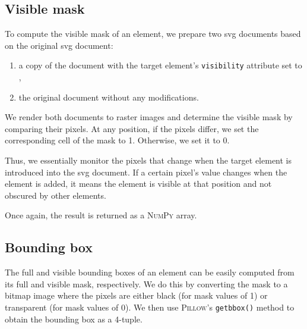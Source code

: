 \subsection{Visible mask}

To compute the visible mask of an element, we prepare two \gls{svg} documents based on the original \gls{svg} document:
\begin{enumerate}
    \item a copy of the document with the target element's \texttt{visibility} attribute set to ,
    \item the original document without any modifications.
\end{enumerate}

We render both documents to raster images and determine the visible mask by comparing their pixels. At any position, if the pixels differ, we set the corresponding cell of the mask to 1. Otherwise, we set it to 0. 

Thus, we essentially monitor the pixels that change when the target element is introduced into the \gls{svg} document. If a certain pixel's value changes when the element is added, it means the element is visible at that position and not obscured by other elements. 

Once again, the result is returned as a \textsc{NumPy} array.

\subsection{Bounding box}

The full and visible bounding boxes of an element can be easily computed from its full and visible mask, respectively. We do this by converting the mask to a bitmap image where the pixels are either black (for mask values of 1) or transparent (for mask values of 0). We then use \textsc{Pillow}'s \texttt{getbbox()} method to obtain the bounding box as a 4-tuple.